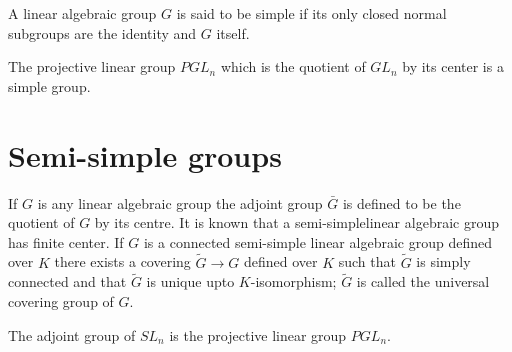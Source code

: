 \begin{defi*}%
A linear algebraic group $G$ is said to be simple if its only closed
normal subgroups are the identity and $G$ itself. 
\end{defi*}

\begin{example*}
The projective linear group $PGL_n$ which is the quotient of $GL_n$ by
its center is a simple group.  
\end{example*}


\section{Semi-simple groups}\label{chap2:sec2.2}

If $G$ is any linear algebraic group the adjoint group  $\bar{G}$ is
defined to be the quotient of $G$ by its centre. It is known that a
semi-simple\pageoriginale linear algebraic group has finite center. If
$G$ is a 
connected semi-simple linear algebraic group defined over $K$ there
exists a covering  $\tilde{G} \rightarrow G $ defined over $K$ such
that $\tilde{G}$ is simply connected and that $\tilde{G}$ is unique
upto $K$-isomorphism; $\tilde{G}$ is called the universal covering
group of $G$. 

\setcounter{exam}{0}
\begin{exam}\label{chap2:exam1}%
The adjoint group of $SL_n$ is the projective linear group $PGL_n$. 
\end{exam}

